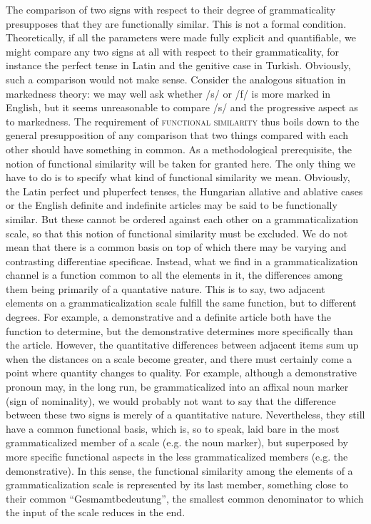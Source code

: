 \label{page135}The comparison of two signs with respect to their degree of grammaticality presupposes that they are functionally similar. This is not a formal condition. Theoretically, if all the parameters were made fully explicit and quantifiable, we might compare any two signs at all with respect to their grammaticality, for instance the perfect tense in Latin and the genitive case in Turkish. Obviously, such a comparison would not make sense. Consider the analogous situation in markedness theory: we may well ask whether /s/ or /f/ is more marked in English, but it seems unreasonable to compare /s/ and the progressive aspect as to markedness. The requirement of \textsc{functional similarity} thus boils down to the general presupposition of any comparison that two things compared with each other should have something in common. As a methodological prerequisite, the notion of functional similarity will be taken for granted here. The only thing we have to do is to specify what kind of functional similarity we mean. Obviously, the Latin perfect und pluperfect tenses, the Hungarian allative and ablative cases or the English definite and indefinite articles may be said to be functionally similar. But these cannot be ordered against each other on a grammaticalization scale, so that this notion of functional similarity must be excluded. We do not mean that there is a common basis on top of which there may be varying and contrasting differentiae specificae. Instead, what we find in a grammaticalization channel is a function common to all the elements in it, the differences among them being primarily of a quantative nature. This is to say, two adjacent elements on a grammaticalization scale fulfill the same function, but to different degrees. For example, a demonstrative and a definite article both have the function to determine, but the demonstrative determines more specifically than the article. However, the quantitative differences between adjacent items sum up when the distances on a scale become greater, and there must certainly come a point where quantity changes to quality. For example, although a demonstrative pronoun may, in the long run, be grammaticalized into an affixal noun marker (sign of nominality), we would probably not want to say that the difference between these two signs is merely of a quantitative nature. Nevertheless, they still have a common functional basis, which is, so to speak, laid bare in the most grammaticalized member of a scale (e.g. the noun marker), but superposed by more specific functional aspects in the less grammaticalized members (e.g. the demonstrative). In this sense, the functional similarity among the elements of a grammaticalization scale is represented by its last member, something close to their common ``Gesmamtbedeutung'', the smallest common denominator to which the input of the scale reduces in the end.\label{page135b}


